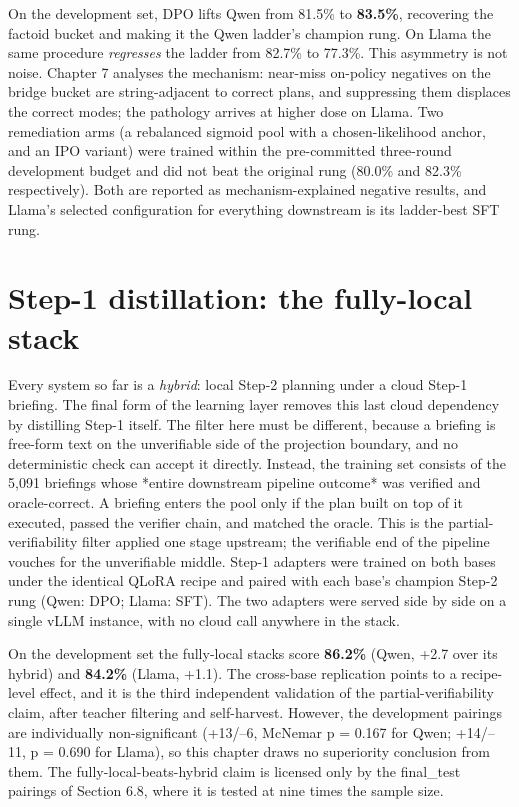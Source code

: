 On the development set, DPO lifts Qwen from 81.5\% to \textbf{83.5\%}, recovering the factoid bucket
and making it the Qwen ladder's champion rung. On Llama the same procedure \emph{regresses} the
ladder from 82.7\% to 77.3\%. This asymmetry is not noise. Chapter 7 analyses the mechanism:
near-miss on-policy negatives on the bridge bucket are string-adjacent to correct plans, and
suppressing them displaces the correct modes; the pathology arrives at higher dose on Llama.
Two remediation arms (a rebalanced sigmoid pool with a chosen-likelihood anchor, and an IPO
variant) were trained within the pre-committed three-round development budget and did not beat
the original rung (80.0\% and 82.3\% respectively). Both are reported as mechanism-explained
negative results, and Llama's selected configuration for everything downstream is its
ladder-best SFT rung.

\section{Step-1 distillation: the fully-local stack}\label{sec:step-1-distillation-the-fully-local-stac}

Every system so far is a \emph{hybrid}: local Step-2 planning under a cloud Step-1 briefing. The
final form of the learning layer removes this last cloud dependency by distilling Step-1
itself. The filter here must be different, because a briefing is free-form text on the
unverifiable side of the projection boundary, and no deterministic check can accept it
directly. Instead, the training set consists of the 5,091 briefings whose *entire downstream
pipeline outcome* was verified and oracle-correct. A briefing enters the pool only if the plan
built on top of it executed, passed the verifier chain, and matched the oracle. This is the
partial-verifiability filter applied one stage upstream; the verifiable end of the pipeline
vouches for the unverifiable middle. Step-1 adapters were trained on both bases under the
identical QLoRA recipe and paired with each base's champion Step-2 rung (Qwen: DPO; Llama:
SFT). The two adapters were served side by side on a single vLLM instance, with no cloud call
anywhere in the stack.

On the development set the fully-local stacks score \textbf{86.2\%} (Qwen, +2.7 over its hybrid) and
\textbf{84.2\%} (Llama, +1.1). The cross-base replication points to a recipe-level effect, and it is
the third independent validation of the partial-verifiability claim, after teacher filtering
and self-harvest. However, the development pairings are individually non-significant
(+13/--6, McNemar p = 0.167 for Qwen; +14/--11, p = 0.690 for Llama), so this chapter draws no
superiority conclusion from them. The fully-local-beats-hybrid claim is licensed only by the
final\_test pairings of Section 6.8, where it is tested at nine times the sample size.

